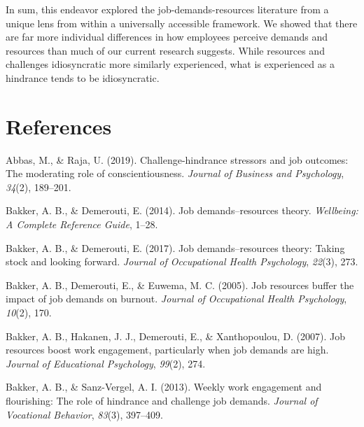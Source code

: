 \documentclass[
  man,mask]{apa7}
\newlength{\cslhangindent}
\newlength{\cslentryspacingunit} %
\newenvironment{CSLReferences}[2] %
 {%
  \setlength{\parindent}{0pt}
  \ifodd #1
  \let\oldpar\par
  \def\par{\hangindent=\cslhangindent\oldpar}
  \fi
  \setlength{\parskip}{#2\cslentryspacingunit}
 }%
 {}
\begin{document}
In sum, this endeavor explored the job-demands-resources literature from a unique lens from within a universally accessible framework. We showed that there are far more individual differences in how employees perceive demands and resources than much of our current research suggests. While resources and challenges idiosyncratic more similarly experienced, what is experienced as a hindrance tends to be idiosyncratic.

\hypertarget{references}{%
\section{References}\label{references}}

\begingroup
\setlength{\parindent}{-0.5in}
\setlength{\leftskip}{0.5in}

\hypertarget{refs}{}
\begin{CSLReferences}{1}{0}
\leavevmode{}%
Abbas, M., \& Raja, U. (2019). Challenge-hindrance stressors and job outcomes: The moderating role of conscientiousness. \emph{Journal of Business and Psychology}, \emph{34}(2), 189--201.

\leavevmode{}%
Bakker, A. B., \& Demerouti, E. (2014). Job demands--resources theory. \emph{Wellbeing: A Complete Reference Guide}, 1--28.

\leavevmode{}%
Bakker, A. B., \& Demerouti, E. (2017). Job demands--resources theory: Taking stock and looking forward. \emph{Journal of Occupational Health Psychology}, \emph{22}(3), 273.

\leavevmode{}%
Bakker, A. B., Demerouti, E., \& Euwema, M. C. (2005). Job resources buffer the impact of job demands on burnout. \emph{Journal of Occupational Health Psychology}, \emph{10}(2), 170.

\leavevmode{}%
Bakker, A. B., Hakanen, J. J., Demerouti, E., \& Xanthopoulou, D. (2007). Job resources boost work engagement, particularly when job demands are high. \emph{Journal of Educational Psychology}, \emph{99}(2), 274.

\leavevmode{}%
Bakker, A. B., \& Sanz-Vergel, A. I. (2013). Weekly work engagement and flourishing: The role of hindrance and challenge job demands. \emph{Journal of Vocational Behavior}, \emph{83}(3), 397--409.


\end{CSLReferences}
\end{document}
